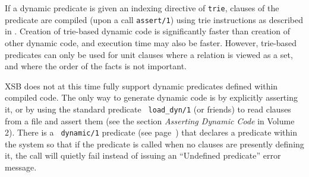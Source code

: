 
If a dynamic predicate is given an indexing directive of {\tt trie},
clauses of the predicate are compiled (upon a call {\tt assert/1})
using trie instructions as described in \cite{RRSSW98}.  Creation of
trie-based dynamic code is significantly faster than creation of other
dynamic code, and execution time may also be faster.  However,
trie-based predicates can only be used for unit clauses where a
relation is viewed as a set, and where the order of the facts is not
important.

XSB does not at this time fully support dynamic predicates defined
within compiled code.  The only way to generate dynamic code is by
explicitly asserting it, or by using the standard predicate {\tt
  load\_dyn/1} (or friends) to read clauses from a file and assert them (see the
section {\it Asserting Dynamic Code} in Volume 2).  There is a {\tt
  dynamic/1} predicate (see page~\pageref{dynamic/1}) that declares a
predicate within the system so that if the predicate is called when no
clauses are presently defining it, the call will quietly fail instead
of issuing an {\sf ``Undefined predicate''} error message.

